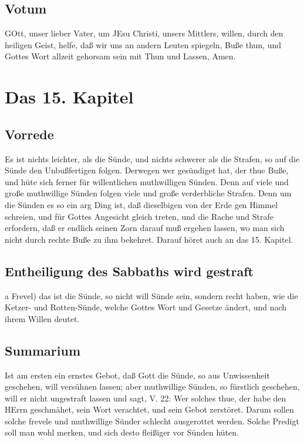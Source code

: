 \section{Votum}

GOtt, unser lieber Vater, um JEsu Christi, unsers Mittlers, willen, durch den heiligen Geist, helfe, daß wir uns an andern Leuten spiegeln, Buße thun, und Gottes Wort allzeit gehorsam sein mit Thun und Lassen, Amen.

\chapter{Das 15. Kapitel}

\section{Vorrede}

Es ist nichts leichter, als die Sünde, und nichts schwerer als die Strafen, so auf die Sünde den Unbußfertigen folgen. Derwegen wer gesündiget hat, der thue Buße, und hüte sich ferner für willentlichen muthwilligen Sünden. Denn auf viele und große muthwillige Sünden folgen viele und große verderbliche Strafen. Denn um die Sünden es so ein arg Ding ist, daß dieselbigen von der Erde gen Himmel schreien, und für Gottes Angesicht gleich treten, und die Rache und Strafe erfordern, daß er endlich seinen Zorn darauf muß ergehen lassen, wo man sich nicht durch rechte Buße zu ihm bekehret. Darauf höret auch an das 15. Kapitel.

\section{Entheiligung des Sabbaths wird gestraft}

a Frevel) das ist die Sünde, so nicht will Sünde sein, sondern recht haben, wie die Ketzer- und Rotten-Sünde, welche Gottes Wort und Gesetze ändert, und nach ihrem Willen deutet.

\section{Summarium}

Ist am ersten ein ernstes Gebot, daß Gott die Sünde, so aus Unwissenheit geschehen, will versühnen lassen; aber muthwillige Sünden, so fürstlich geschehen, will er nicht ungestraft lassen und sagt, V. 22: Wer solches thue, der habe den HErrn geschmähet, sein Wort verachtet, und sein Gebot zerstöret. Darum sollen solche frevele und muthwillige Sünder schlecht ausgerottet werden. Solche Predigt soll man wohl merken, und sich desto fleißiger vor Sünden hüten.

